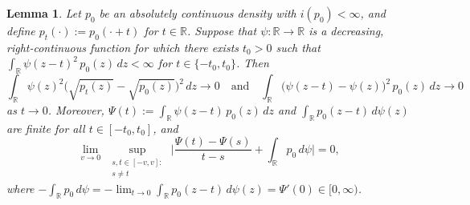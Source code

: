 \documentclass[a4paper]{article}
\newcommand{\R}{\mathbb{R}}
\newtheorem{lemma}[theorem]{Lemma}
\theoremstyle{definition}
\begin{document}
\begin{lemma}
\label{lem:varPsi-deriv}
Let $p_0$ be an absolutely continuous density with $i(p_0) < \infty$, and define $p_t(\cdot) := p_0(\cdot + t)$ for $t \in \R$. Suppose that $\psi \colon \R \to \R$ is a decreasing, right-continuous function for which there exists $t_0 > 0$ such that $\int_\R \psi(z - t)^2\,p_0(z)\,dz < \infty$ for $t \in \{-t_0,t_0\}$. Then
\begin{equation}
\label{eq:psi-shift-limit}
\int_\R \psi(z)^2\bigl(\sqrt{p_t(z)} - \sqrt{p_0(z)}\bigr)^2\,dz \to 0 \quad\text{and}\quad \int_\R \bigl(\psi(z - t) - \psi(z)\bigr)^2\,p_0(z)\,dz \to 0
\end{equation}
as $t \to 0$. Moreover, $\varPsi(t) := \int_\R \psi(z - t)\,p_0(z)\,dz$ and $\int_\R p_0(z - t)\,d\psi(z)$ 
are finite for all $t \in [-t_0,t_0]$, and
\begin{equation}
\label{eq:varPsi-deriv}
\lim_{v \to 0}\,\sup_{\substack{s,t \in [-v,v] : \\ s \neq t}}\,\biggl|\frac{\varPsi(t) - \varPsi(s)}{t - s} + \int_\R p_0\,d\psi\biggr| = 0,
\end{equation}
where $-\int_\R p_0\,d\psi = -\lim_{t \to 0} \int_\R p_0(z - t)\,d\psi(z) = \varPsi'(0) \in [0,\infty)$.
\end{lemma}
\end{document}
